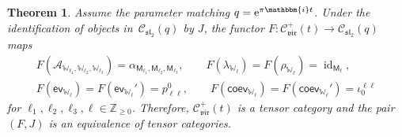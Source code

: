 \documentclass[10pt,a4paper]{amsart}
\numberwithin{equation}{section}
\newtheorem{thm}{Theorem}[section]
\newcommand{\id}{\operatorname{id}}
\newcommand{\bZ}{\mathbb{Z}}
\newcommand{\cA}{\mathcal{A}}
\newcommand{\cC}{\mathcal{C}}
\newcommand{\fsl}{\mathfrak{sl}}
\newcommand{\sfM}{\mathsf{M}}
\newcommand{\bbmi}{\mathbbm{i}}
\newcommand{\QGirrep}[1]{\sfM_{#1}}
\newcommand{\CGemb}[3]{\iota_{#1}^{#2 #3}}
\newcommand{\CGproj}[3]{p^{#1}_{#2 #3}}
\newcommand{\catQG}{\cC_{\fsl_{2}}}
\newcommand{\catVir}{\cC_{\vir}}
\newcommand{\virmod}{\mathbb{W}}
\newcommand{\vir}{\mathfrak{vir}}
\newcommand{\ev}{\mathsf{ev}}
\newcommand{\coev}{\mathsf{coev}}
\begin{document}
\begin{thm}
\label{thm:equivalence_vir_QG}
Assume the parameter matching $q={\rm e}^{\pi\bbmi t}$.
Under the identification of objects in~$\catQG (q)$ by $J$, the functor $F\colon \catVir^{+}(t) \to \catQG(q)$ maps
\begin{gather*}
	F(\cA_{\virmod_{\ell_{1}},\virmod_{\ell_{2}},\virmod_{\ell_{3}}}) = \alpha_{\QGirrep{\ell_{1}},\QGirrep{\ell_{2}},\QGirrep{\ell_{3}}}, \qquad
	F(\lambda_{\virmod_{\ell}}) = F(\rho_{\virmod_{\ell}}) = \id_{\QGirrep{\ell}}, \\
	F(\ev_{\virmod_{\ell}}) = F(\ev_{\virmod_{\ell}}') = \CGproj{0}{\ell}{\ell},\qquad
	F(\coev_{\virmod_{\ell}}) = F(\coev_{\virmod_{\ell}}') = \CGemb{0}{\ell}{\ell}
\end{gather*}
for $\ell_{1},\ell_{2},\ell_{3},\ell\in \bZ_{\geq 0}$.
Therefore, $\catVir^{+}(t)$ is a tensor category and the pair $(F,J)$ is an equivalence of tensor categories.
\end{thm}
\end{document}
